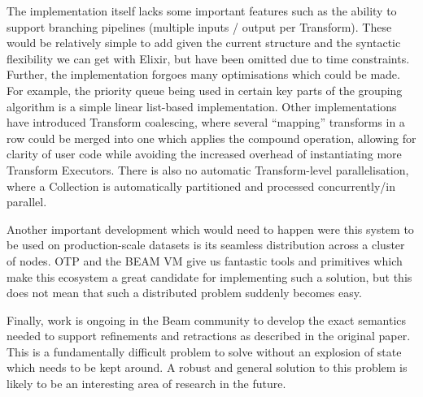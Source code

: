 The implementation itself lacks some important features such as the ability to support branching pipelines (multiple inputs / output per Transform).
These would be relatively simple to add given the current structure and the syntactic flexibility we can get with Elixir, but have been omitted due to time constraints.
Further, the implementation forgoes many optimisations which could be made.
For example, the priority queue being used in certain key parts of the grouping algorithm is a simple linear list-based implementation.
Other implementations have introduced Transform coalescing, where several ``mapping'' transforms in a row could be merged into one which applies the compound operation, allowing for clarity of user code while avoiding the increased overhead of instantiating more Transform Executors.
There is also no automatic Transform-level parallelisation, where a Collection is automatically partitioned and processed concurrently/in parallel.

Another important development which would need to happen were this system to be used on production-scale datasets is its seamless distribution across a cluster of nodes.
OTP and the BEAM VM give us fantastic tools and primitives which make this ecosystem a great candidate for implementing such a solution, but this does not mean that such a distributed problem suddenly becomes easy.

Finally, work is ongoing in the Beam community to develop the exact semantics needed to support refinements and retractions as described in the original paper.
This is a fundamentally difficult problem to solve without an explosion of state which needs to be kept around.
A robust and general solution to this problem is likely to be an interesting area of research in the future.